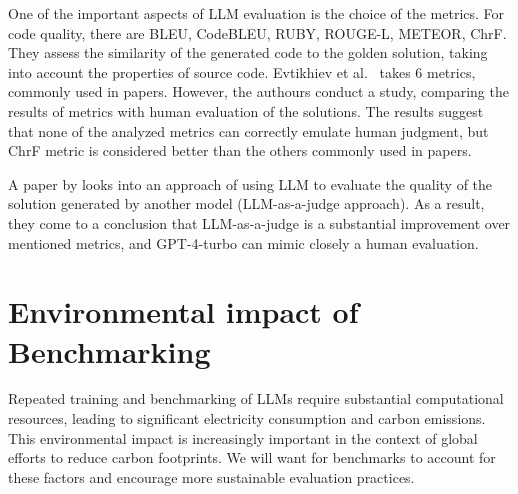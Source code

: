 One of the important aspects of LLM evaluation is the choice of the metrics.
For code quality, there are BLEU, CodeBLEU, RUBY, ROUGE-L, METEOR, ChrF\@.
They assess the similarity of the generated code to the golden solution, taking into account the properties of source code.
Evtikhiev et al.~\cite{evtikhiev2023out} takes 6 metrics, commonly used in papers.
However, the authours conduct a study, comparing the results of metrics with human evaluation of the solutions.
The results suggest that none of the analyzed metrics can correctly emulate human judgment, but ChrF metric is considered better than the others commonly used in papers.

A paper by \cite{crupi2025effectiveness} looks into an approach of using LLM to evaluate the quality of the solution generated by another model (LLM-as-a-judge approach).
As a result, they come to a conclusion that LLM-as-a-judge is a substantial improvement over mentioned metrics, and GPT-4-turbo can mimic closely a human evaluation.



\section{Environmental impact of Benchmarking}

Repeated training and benchmarking of LLMs require substantial computational resources, leading to significant electricity consumption and carbon emissions. This environmental impact is increasingly important in the context of global efforts to reduce carbon footprints. We will want for benchmarks to account for these factors and encourage more sustainable evaluation practices.


